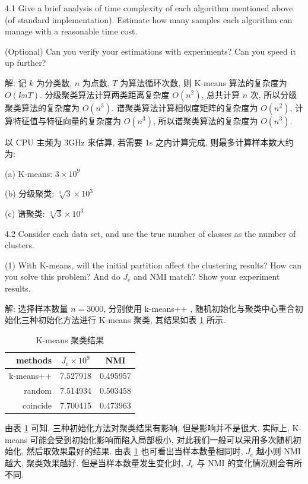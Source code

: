 \documentclass[openany]{ctexbook}
\theoremstyle{kaiti}
\theoremstyle{normal}
\begin{document}
4.1 Give a brief analysis of time complexity of each algorithm mentioned above (of standard implementation). Estimate how many samples each algorithm can manage with a reasonable time cost.

(Optional) Can you verify your estimations with experiments? Can you speed it up further?

解: 记 $k$ 为分类数, $n$ 为点数, $T$ 为算法循环次数, 则 K-means 算法的复杂度为 $O(knT)$. 分级聚类算法计算两类距离复杂度 $O(n^2)$, 总共计算 $n$ 次, 所以分级聚类算法的复杂度为 $O(n^3)$. 谱聚类算法计算相似度矩阵的复杂度为 $O(n^2)$, 计算特征值与特征向量的复杂度为 $O(n^3)$, 所以谱聚类算法的复杂度为 $O(n^3)$.

以 CPU 主频为 3GHz 来估算, 若需要 1s 之内计算完成, 则最多计算样本数大约为:

(a) K-means: $3\times10^9$

(b) 分级聚类: $\sqrt[3]{3}\times10^3$

(c) 谱聚类: $\sqrt[3]{3}\times10^3$

4.2 Consider each data set, and use the true number of classes as the number of clusters.

(1) With K-means, will the initial partition affect the clustering results? How can you solve this problem? And do $J_{e}$ and NMI match? Show your experiment results.

解: 选择样本数量 $n=3000$, 分别使用 k-means++ \cite{kmeans}, 随机初始化与聚类中心重合初始化三种初始化方法进行 K-means 聚类, 其结果如表 \ref{tab:kmeans_initial} 所示.

\begin{table}[htbp]
  \centering
  \caption{K-means 聚类结果}
  \label{tab:kmeans_initial}
  \begin{tabular}{rcc}
    \toprule
    methods & $J_e\times10^{9}$ & NMI \\
    \midrule
    k-means++ & 7.527918 & 0.495957 \\
    random & 7.514934 & 0.503458 \\ 
    coincide & 7.700415 & 0.473963 \\
    \bottomrule
  \end{tabular}
\end{table}

由表 \ref{tab:kmeans_initial} 可知, 三种初始化方法对聚类结果有影响, 但是影响并不是很大. 实际上, K-means 可能会受到初始化影响而陷入局部极小, 对此我们一般可以采用多次随机初始化, 然后取效果最好的结果. 由表 \ref{tab:kmeans_initial} 也可看出当样本数量相同时, $J_e$ 越小则 NMI 越大, 聚类效果越好. 但是当样本数量发生变化时, $J_e$ 与 NMI 的变化情况则会有所不同.
\end{document}
